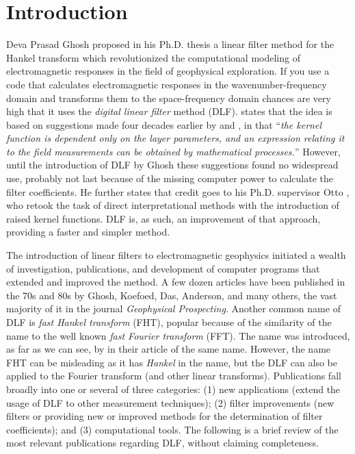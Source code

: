 \documentclass[paper,twocolumn,twoside]{geophysics}
\begin{document}
\section{Introduction}

Deva Prasad Ghosh proposed in his Ph.D. thesis \citep{PhD.70.Ghosh} a linear
filter method for the Hankel transform which revolutionized the computational
modeling of electromagnetic responses in the field of geophysical exploration.
If you use a code that calculates electromagnetic responses in the
wavenumber-frequency domain and transforms them to the space-frequency domain
chances are very high that it uses the \emph{digital linear filter} method
(DLF). \cite{GP.71.Ghosh} states that the idea is based on suggestions made
four decades earlier by \cite{PHY.33.Slichter} and \cite{GEO.40.Pekeris}, in
that ``\emph{the kernel function is dependent only on the layer parameters, and
  an expression relating it to the field measurements can be obtained by
mathematical processes.}'' However, until the introduction of DLF by Ghosh
these suggestions found no widespread use, probably not last because of the
missing computer power to calculate the filter coefficients. He further states
that credit goes to his Ph.D. supervisor Otto \cite{BK.68.Koefoed,
GP.70.Koefoed}, who retook the task of direct interpretational methods with the
introduction of raised kernel functions. DLF is, as such, an improvement of
that approach, providing a faster and simpler method.

The introduction of linear filters to electromagnetic geophysics initiated a
wealth of investigation, publications, and development of computer programs
that extended and improved the method. A few dozen articles have been published
in the 70s and 80s by Ghosh, Koefoed, Das, Anderson, and many others, the vast
majority of it in the journal \emph{Geophysical Prospecting}. Another common
name of DLF is \emph{fast Hankel transform} (FHT), popular because of the
similarity of the name to the well known \emph{fast Fourier transform} (FFT).
The name was introduced, as far as we can see, by \cite{GP.79.Johansen} in
their article of the same name. However, the name FHT can be misleading as it
has \emph{Hankel} in the name, but the DLF can also be applied to the Fourier
transform (and other linear transforms). Publications fall broadly into one or
several of three categories: (1) new applications (extend the usage of DLF to
other measurement techniques); (2) filter improvements (new filters or
providing new or improved methods for the determination of filter
coefficients); and (3) computational tools. The following is a brief review of
the most relevant publications regarding DLF, without claiming completeness.
\end{document}
